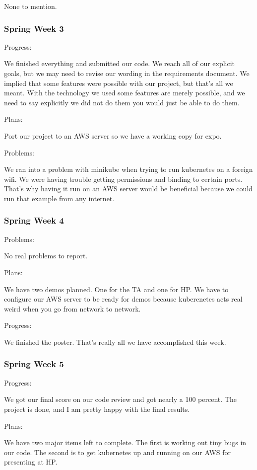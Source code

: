 \documentclass[onecolumn, draftclsnofoot,10pt, compsoc]{IEEEtran}
\begin{document}
None to mention.

\subsubsection*{Spring Week 3}

Progress:

We finished everything and submitted our code. We reach all of our explicit goals, but we may need to revise our wording in the requirements document. We implied that some features were possible with our project, but that's all we meant. With the technology we used some features are merely possible, and we need to say explicitly we did not do them you would just be able to do them.

Plans:

Port our project to an AWS server so we have a working copy for expo.

Problems:

We ran into a problem with minikube when trying to run kubernetes on a foreign wifi. We were having trouble getting permissions and binding to certain ports. That's why having it run on an AWS server would be beneficial because we could run that example from any internet.

\subsubsection*{Spring Week 4}

Problems:

No real problems to report.

Plans:

We have two demos planned. One for the TA and one for HP. We have to configure our AWS server to be ready for demos because kuberenetes acts real weird when you go from network to network.

Progress:

We finished the poster. That's really all we have accomplished this week.

\subsubsection*{Spring Week 5}

Progress:

We got our final score on our code review and got nearly a 100 percent. The project is done, and I am pretty happy with the final results.

Plans:

We have two major items left to complete. The first is working out tiny bugs in our code. The second is to get kubernetes up and running on our AWS for presenting at HP.
\end{document}
